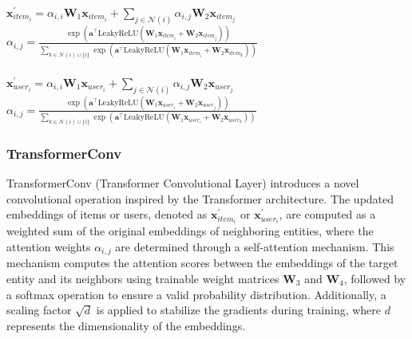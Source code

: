 \documentclass{scrartcl}
\begin{document}
\begin{center}
    $\mathbf{x}^{\prime}_{item_{i}} = \alpha_{i,i}\mathbf{W}_{1}\mathbf{x}_{item_{i}} + \sum_{j \in \mathcal{N}(i)} \alpha_{i,j}\mathbf{W}_{2}\mathbf{x}_{item_{j}}$ \\ 
    $\alpha_{i,j} = \frac{\exp\left(\mathbf{a}^{\top}\mathrm{LeakyReLU}\left(\mathbf{W}_{1} \mathbf{x}_{item_{i}} + \mathbf{W}_{2} \mathbf{x}_{item_{j}}\right)\right)}{\sum_{k \in \mathcal{N}(i) \cup \{ i \}} \exp\left(\mathbf{a}^{\top}\mathrm{LeakyReLU}\left(\mathbf{W}_{1} \mathbf{x}_{item_{i}} + \mathbf{W}_{2} \mathbf{x}_{item_{k}}\right)\right)}$ \\~\\
    $\mathbf{x}^{\prime}_{user_{i}} = \alpha_{i,i}\mathbf{W}_{1}\mathbf{x}_{user_{i}} + \sum_{j \in \mathcal{N}(i)} \alpha_{i,j}\mathbf{W}_{2}\mathbf{x}_{user_{j}}$ \\ 
    $\alpha_{i,j} = \frac{\exp\left(\mathbf{a}^{\top}\mathrm{LeakyReLU}\left(\mathbf{W}_{1} \mathbf{x}_{user_{i}} + \mathbf{W}_{2} \mathbf{x}_{user_{j}}\right)\right)}{\sum_{k \in \mathcal{N}(i) \cup \{ i \}} \exp\left(\mathbf{a}^{\top}\mathrm{LeakyReLU}\left(\mathbf{W}_{1} \mathbf{x}_{user_{i}} + \mathbf{W}_{2} \mathbf{x}_{user_{k}}\right)\right)}$
\end{center}

\subsubsection{TransformerConv\cite{transformerconv}} 

\quad TransformerConv (Transformer Convolutional Layer) introduces a novel convolutional operation inspired by the Transformer\cite{transformer} architecture. The updated embeddings of items or users, denoted as $\mathbf{x}^{\prime}_{item_i}$ or $\mathbf{x}^{\prime}_{user_i}$, are computed as a weighted sum of the original embeddings of neighboring entities, where the attention weights $\alpha_{i,j}$ are determined through a self-attention mechanism. This mechanism computes the attention scores between the embeddings of the target entity and its neighbors using trainable weight matrices $\mathbf{W}_3$ and $\mathbf{W}_4$, followed by a softmax operation to ensure a valid probability distribution. Additionally, a scaling factor $\sqrt{d}$ is applied to stabilize the gradients during training, where $d$ represents the dimensionality of the embeddings. \\ 
\end{document}
